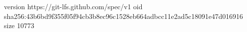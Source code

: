 version https://git-lfs.github.com/spec/v1
oid sha256:43b6bd9f355f05f94cb3b8ec96c1528eb664adbcc11e2ad5c18091e47d016916
size 10773
